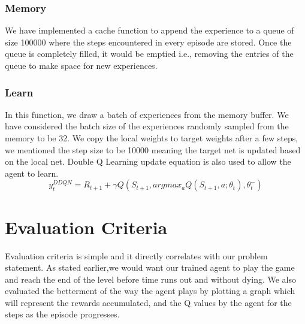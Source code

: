 \documentclass[conference]{IEEEtran}
\theoremstyle{definition}
\begin{document}
\subsubsection{Memory}
We have implemented a cache function to append the experience to a queue of size 100000 where the steps encountered in every episode are stored. Once the queue is completely filled, it would be emptied i.e., removing the entries of the queue to make space for new experiences.
\\
\subsubsection{Learn}
In this function, we draw a batch of experiences from the memory buffer. We have considered the batch size of the experiences randomly sampled from the memory to be 32. We copy the local weights to target weights after a few steps, we mentioned the step size to be 10000 meaning the target net is updated based on the local net. Double Q Learning update equation is also used to allow the agent to learn.
\[ y_t^{DDQN} = R_{t+1} + \gamma Q(S_{t+1}, argmax_aQ(S_{t+1},a;\theta_t),\theta_t^{-})\]

\section{Evaluation Criteria}
Evaluation criteria is simple and it directly correlates with our problem statement. As stated earlier,we would want our trained agent to play the game and reach the end of the level before time runs out and without dying.
We also evaluated the betterment of the way the agent plays by plotting a graph which will represent the rewards accumulated, and the Q values by the agent for the steps as the episode progresses.
\end{document}

